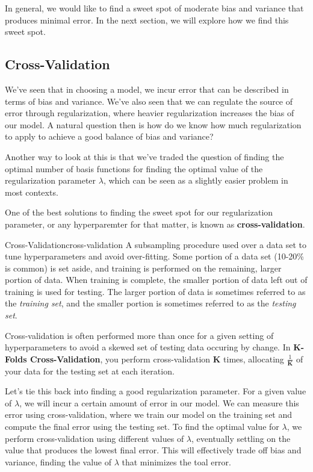 In general, we would like to find a sweet spot of moderate bias and variance that produces minimal error. In the next section, we will explore how we find this sweet spot.

\subsection{Cross-Validation}
We've seen that in choosing a model, we incur error that can be described in terms of bias and variance. We've also seen that we can regulate the source of error through regularization, where heavier regularization increases the bias of our model. A natural question then is how do we know how much regularization to apply to achieve a good balance of bias and variance?

Another way to look at this is that we've traded the question of finding the optimal number of basis functions for finding the optimal value of the regularization parameter $\lambda$, which can be seen as a slightly easier problem in most contexts.

One of the best solutions to finding the sweet spot for our regularization parameter, or any hyperparemter for that matter, is known as \textbf{cross-validation}.

\begin{definition}{Cross-Validation}{cross-validation}
    A subsampling procedure used over a data set to tune hyperparameters and avoid over-fitting. Some portion of a data set (10-20\% is common) is set aside, and training is performed on the remaining, larger portion of data. When training is complete, the smaller portion of data left out of training is used for testing. The larger portion of data is sometimes referred to as the \textit{training set}, and the smaller portion is sometimes referred to as the \textit{testing set}.
\end{definition}

Cross-validation is often performed more than once for a given setting of hyperparameters to avoid a skewed set of testing data occuring by change. In \textbf{K-Folds Cross-Validation}, you perform cross-validation \textbf{K} times, allocating $\frac{1}{\textbf{K}}$ of your data for the testing set at each iteration.

Let's tie this back into finding a good regularization parameter. For a given value of $\lambda$, we will incur a certain amount of error in our model. We can measure this error using cross-validation, where we train our model on the training set and compute the final error using the testing set. To find the optimal value for $\lambda$, we perform cross-validation using different values of $\lambda$, eventually settling on the value that produces the lowest final error. This will effectively trade off bias and variance, finding the value of $\lambda$ that minimizes the toal error.

